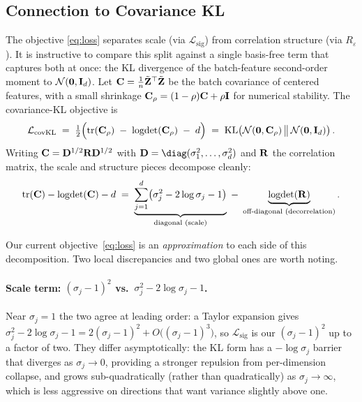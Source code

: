 \subsection{Connection to Covariance KL}
\label{sec:covkl}

The objective \eqref{eq:loss} separates scale (via $\mathcal{L}_\text{sig}$) from correlation structure (via $R_\varepsilon$). It is instructive to compare this split against a single basis-free term that captures both at once: the KL divergence of the batch-feature second-order moment to $\mathcal{N}(\mathbf{0}, \mathbf{I}_d)$. Let $\mathbf{C} = \tfrac{1}{n}\tilde{\mathbf{Z}}^\top \tilde{\mathbf{Z}}$ be the batch covariance of centered features, with a small shrinkage $\mathbf{C}_\rho = (1-\rho)\mathbf{C} + \rho \mathbf{I}$ for numerical stability. The covariance-KL objective is
\begin{equation}
\label{eq:covkl}
    \mathcal{L}_\text{covKL} \;=\; \tfrac{1}{2}\Bigl(\operatorname{tr}(\mathbf{C}_\rho) \;-\; \operatorname{logdet}(\mathbf{C}_\rho) \;-\; d\Bigr)
    \;=\; \mathrm{KL}\!\left(\mathcal{N}(\mathbf{0}, \mathbf{C}_\rho) \,\big\|\, \mathcal{N}(\mathbf{0}, \mathbf{I}_d)\right).
\end{equation}
Writing $\mathbf{C} = \mathbf{D}^{1/2}\mathbf{R}\mathbf{D}^{1/2}$ with $\mat{D} = \diag(\sigma_1^2, \dots, \sigma_d^2)$ and $\mathbf{R}$ the correlation matrix, the scale and structure pieces decompose cleanly:
\begin{equation}
\label{eq:covkl_decomp}
    \operatorname{tr}(\mathbf{C}) - \operatorname{logdet}(\mathbf{C}) - d
    \;=\; \underbrace{\sum_{j=1}^{d}\bigl(\sigma_j^2 - 2\log\sigma_j - 1\bigr)}_{\text{diagonal (scale)}} \;-\; \underbrace{\operatorname{logdet}(\mathbf{R})}_{\text{off-diagonal (decorrelation)}}.
\end{equation}

Our current objective~\eqref{eq:loss} is an \emph{approximation} to each side of this decomposition. Two local discrepancies and two global ones are worth noting.

\paragraph{Scale term: $(\sigma_j - 1)^2$ vs.~$\sigma_j^2 - 2\log\sigma_j - 1$.}
Near $\sigma_j = 1$ the two agree at leading order: a Taylor expansion gives $\sigma_j^2 - 2\log\sigma_j - 1 = 2(\sigma_j - 1)^2 + O\!\bigl((\sigma_j - 1)^3\bigr)$, so $\mathcal{L}_\text{sig}$ is our $(\sigma_j-1)^2$ up to a factor of two. They differ asymptotically: the KL form has a $-\log\sigma_j$ barrier that diverges as $\sigma_j \to 0$, providing a stronger repulsion from per-dimension collapse, and grows sub-quadratically (rather than quadratically) as $\sigma_j \to \infty$, which is less aggressive on directions that want variance slightly above one.


